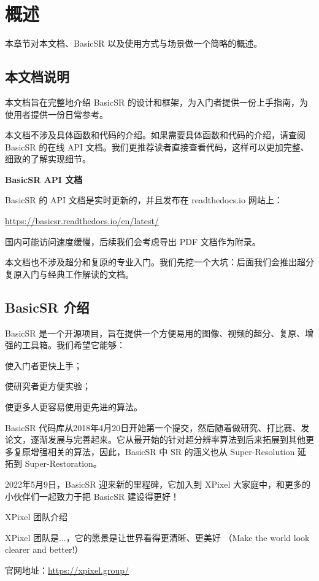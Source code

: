 \documentclass[../main.tex]{subfiles}
\begin{document}
\chapter{概述}
\vspace{-2cm}

本章节对本文档、BasicSR 以及使用方式与场景做一个简略的概述。

\section{本文档说明}

本文档旨在完整地介绍 BasicSR 的设计和框架，为入门者提供一份上手指南，为使用者提供一份日常参考。

本文档不涉及具体函数和代码的介绍。如果需要具体函数和代码的介绍，请查阅 BasicSR 的在线 API 文档。我们更推荐读者直接查看代码，这样可以更加完整、细致的了解实现细节。

\begin{hl} %
	\textbf{BasicSR API 文档}
	
	BasicSR 的 API 文档是实时更新的，并且发布在 readthedocs.io 网站上：
	
	\url{https://basicsr.readthedocs.io/en/latest/}
	
	国内可能访问速度缓慢，后续我们会考虑导出 PDF 文档作为附录。
\end{hl}

本文档也不涉及超分和复原的专业入门。我们先挖一个大坑：后面我们会推出超分复原入门与经典工作解读的文档。

\section{BasicSR 介绍}

BasicSR 是一个开源项目，旨在提供一个方便易用的图像、视频的超分、复原、增强的工具箱。我们希望它能够：

\centerline{使入门者更快上手；}
\centerline{使研究者更方便实验；}
\centerline{使更多人更容易使用更先进的算法。}

BasicSR 代码库从2018年4月20日开始第一个提交，然后随着做研究、打比赛、发论文，逐渐发展与完善起来。它从最开始的针对超分辨率算法到后来拓展到其他更多复原增强相关的算法，因此，BasicSR 中 SR 的涵义也从 Super-Resolution 延拓到 Super-Restoration。

2022年5月9日，BasicSR 迎来新的里程碑，它加入到 XPixel 大家庭中，和更多的小伙伴们一起致力于把 BasicSR 建设得更好！

\begin{exampleBox}[]{XPixel 团队介绍}
	
	XPixel 团队是...，它的愿景是让世界看得更清晰、更美好 （Make the world look clearer and better!）
	
	官网地址：\url{https://xpixel.group/}
\end{exampleBox}
\end{document}

